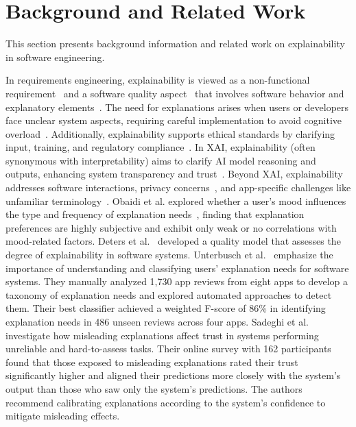 \section{Background and Related Work}
\label{sec:background}

This section presents background information and related work on explainability in software engineering.

In requirements engineering, explainability is viewed as a non-functional requirement~\cite{chazette2020explainability,kohl2019explainability} and a software quality aspect~\cite{chazette2021exploring} that involves software behavior and explanatory elements~\cite{kohl2019explainability}. The need for explanations arises when users or developers face unclear system aspects, requiring careful implementation to avoid cognitive overload~\cite{droste2024explanations,chazette2020explainability}. Additionally, explainability supports ethical standards by clarifying input, training, and regulatory compliance~\cite{buiten2023vision}.
In XAI, explainability (often synonymous with interpretability) aims to clarify AI model reasoning and outputs, enhancing system transparency and trust~\cite{droste2024peeking,kastner2021relation}. Beyond XAI, explainability addresses software interactions, privacy concerns~\cite{brunotte2023privacy}, and app-specific challenges like unfamiliar terminology~\cite{droste2024explanations,deters2023ondemand}.
Obaidi et al. explored whether a user's mood influences the type and frequency of explanation needs~\cite{obaidi2025mood}, finding that explanation preferences are highly subjective and exhibit only weak or no correlations with mood-related factors. 
Deters et al.~\cite{deters2024qualitymodel} developed a quality model that assesses the degree of explainability in software systems.
Unterbusch et al.~\cite{unterbusch2023explanation} emphasize the importance of understanding and classifying users' explanation needs for software systems. They manually analyzed 1,730 app reviews from eight apps to develop a taxonomy of explanation needs and explored automated approaches to detect them. Their best classifier achieved a weighted F-score of 86\% in identifying explanation needs in 486 unseen reviews across four apps.  
Sadeghi et al.~\cite{sadeghi2024explanation} investigate how misleading explanations affect trust in systems performing unreliable and hard-to-assess tasks. Their online survey with 162 participants found that those exposed to misleading explanations rated their trust significantly higher and aligned their predictions more closely with the system's output than those who saw only the system’s predictions. The authors recommend calibrating explanations according to the system’s confidence to mitigate misleading effects.
